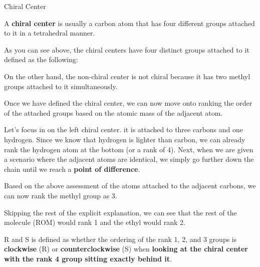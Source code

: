 \documentclass[10pt]{article}
\begin{document}
    \begin{core}{Chiral Center}

      A \textbf{chiral center} is usually a carbon atom that has four different groups attached to it in a tetrahedral manner. 


      As you can see above, the chiral centers have four distinct groups attached to it defined as the following:



      On the other hand, the non-chiral center is not chiral because it has two methyl groups attached to it simultaneously.


      Once we have defined the chiral center, we can now move onto ranking the order of the attached groups based on the atomic mass of the adjacent atom.

      Let's focus in on the left chiral center. it is attached to three carbons and one hydrogen. Since we know that hydrogen is lighter than carbon, we can already rank the hydrogen atom at the bottom (or a rank of 4). Next, when we are given a scenario where the adjacent atoms are identical, we simply go further down the chain until we reach a \textbf{point of difference}. 




      Based on the above assessment of the atoms attached to the adjacent carbons, we can now rank the methyl group as 3.

      Skipping the rest of the explicit explanation, we can see that the rest of the molecule (ROM) would rank 1 and the ethyl would rank 2.





      R and S is defined as whether the ordering of the rank 1, 2, and 3 groups is \textbf{clockwise} (R) or \textbf{counterclockwise} (S) when \textbf{looking at the chiral center with the rank 4 group sitting exactly behind it}.


    \end{core}
\end{document}
